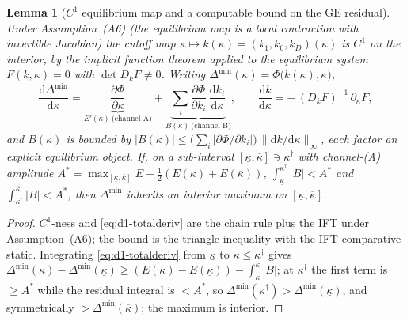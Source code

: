 \documentclass[11pt]{article}
\newtheorem{lemma}{Lemma}
\newcommand{\1}{\mathbf{1}}
\begin{document}
\begin{lemma}[$C^1$ equilibrium map and a computable bound on the GE residual]
\label{lem:d1-ift}
Under Assumption~\textup{(A6)} (the equilibrium map is a local contraction with
invertible Jacobian) the cutoff map $\kappa\mapsto k(\kappa)=(k_1,k_0,k_D)(\kappa)$
is $C^1$ on the interior, by the implicit function theorem applied to the
equilibrium system $F(k,\kappa)=0$ with $\det D_kF\neq0$. Writing
$\Delta^{\min}(\kappa)=\Phi\big(k(\kappa),\kappa\big)$,
\begin{equation}
  \frac{\mathrm{d}\Delta^{\min}}{\mathrm{d}\kappa}
  =\underbrace{\frac{\partial\Phi}{\partial\kappa}}_{E'(\kappa)\ \text{(channel A)}}
  +\underbrace{\sum_{i}\frac{\partial\Phi}{\partial k_i}\,
       \frac{\mathrm{d} k_i}{\mathrm{d}\kappa}}_{B(\kappa)\ \text{(channel B)}},
  \qquad
  \frac{\mathrm{d} k}{\mathrm{d}\kappa}=-\,(D_kF)^{-1}\,\partial_\kappa F,
  \label{eq:d1-totalderiv}
\end{equation}
and $B(\kappa)$ is bounded by
$|B(\kappa)|\le\big(\sum_i|\partial\Phi/\partial k_i|\big)\,
\|\mathrm{d} k/\mathrm{d}\kappa\|_\infty$, each factor an explicit equilibrium object.
If, on a sub-interval $[\underline\kappa,\overline\kappa]\ni\kappa^{\dagger}$
with channel-(A) amplitude $A^{*}=\max_{[\underline\kappa,\overline\kappa]}E-
\tfrac12(E(\underline\kappa)+E(\overline\kappa))$,
$\int_{\underline\kappa}^{\kappa^{\dagger}}|B|<A^{*}$ and
$\int_{\kappa^{\dagger}}^{\overline\kappa}|B|<A^{*}$, then $\Delta^{\min}$
inherits an interior maximum on $[\underline\kappa,\overline\kappa]$.
\end{lemma}

\begin{proof}
$C^1$-ness and \eqref{eq:d1-totalderiv} are the chain rule plus the IFT under
Assumption~\textup{(A6)}; the bound is the triangle inequality with the IFT
comparative static. Integrating \eqref{eq:d1-totalderiv} from $\underline\kappa$
to $\kappa\le\kappa^{\dagger}$ gives
$\Delta^{\min}(\kappa)-\Delta^{\min}(\underline\kappa)
\ge(E(\kappa)-E(\underline\kappa))-\int_{\underline\kappa}^{\kappa}|B|$; at
$\kappa^{\dagger}$ the first term is $\ge A^{*}$ while the residual integral is
$<A^{*}$, so $\Delta^{\min}(\kappa^{\dagger})>\Delta^{\min}(\underline\kappa)$,
and symmetrically $>\Delta^{\min}(\overline\kappa)$; the maximum is interior.
\end{proof}
\end{document}
